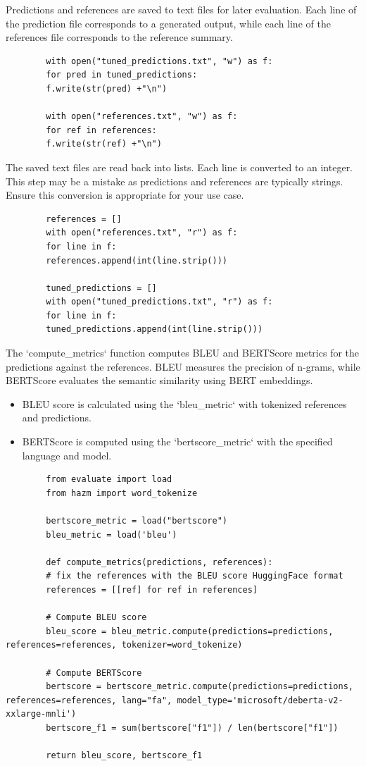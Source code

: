 \documentclass{solutionclass} %
\begin{document}
\begin{solution}
	Predictions and references are saved to text files for later evaluation. Each line of the prediction file corresponds to a generated output, while each line of the references file corresponds to the reference summary.
	\begin{lstlisting}
		with open("tuned_predictions.txt", "w") as f:
		for pred in tuned_predictions:
		f.write(str(pred) +"\n")
		
		with open("references.txt", "w") as f:
		for ref in references:
		f.write(str(ref) +"\n")
	\end{lstlisting}
\end{solution}

\begin{solution}
	The saved text files are read back into lists. Each line is converted to an integer. This step may be a mistake as predictions and references are typically strings. Ensure this conversion is appropriate for your use case.
	\begin{lstlisting}
		references = []
		with open("references.txt", "r") as f:
		for line in f:
		references.append(int(line.strip()))
		
		tuned_predictions = []
		with open("tuned_predictions.txt", "r") as f:
		for line in f:
		tuned_predictions.append(int(line.strip()))
	\end{lstlisting}
\end{solution}

\begin{solution}
	The `compute\_metrics` function computes BLEU and BERTScore metrics for the predictions against the references. BLEU measures the precision of n-grams, while BERTScore evaluates the semantic similarity using BERT embeddings.
	
	\begin{itemize}
		\item BLEU score is calculated using the `bleu\_metric` with tokenized references and predictions.
		\item BERTScore is computed using the `bertscore\_metric` with the specified language and model.
	\end{itemize}
	\begin{lstlisting}
		from evaluate import load
		from hazm import word_tokenize
		
		bertscore_metric = load("bertscore")
		bleu_metric = load('bleu')
		
		def compute_metrics(predictions, references):
		# fix the references with the BLEU score HuggingFace format
		references = [[ref] for ref in references]
		
		# Compute BLEU score
		bleu_score = bleu_metric.compute(predictions=predictions, references=references, tokenizer=word_tokenize)
		
		# Compute BERTScore
		bertscore = bertscore_metric.compute(predictions=predictions, references=references, lang="fa", model_type='microsoft/deberta-v2-xxlarge-mnli')
		bertscore_f1 = sum(bertscore["f1"]) / len(bertscore["f1"])
		
		return bleu_score, bertscore_f1
	\end{lstlisting}
\end{solution}
\end{document}
